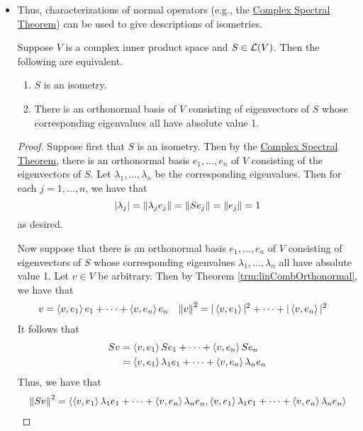 \documentclass[../main.tex]{subfiles}
\begin{document}
\begin{itemize}
    \item Thus, characterizations of normal operators (e.g., the \hyperref[trm:ComplexSpectral]{Complex Spectral Theorem}) can be used to give descriptions of isometries.
    \begin{theorem}\label{trm:isomEigenvalues}
        Suppose $V$ is a complex inner product space and $S\in\mathcal{L}(V)$. Then the following are equivalent.
        \begin{enumerate}[label={\textup{(}\alph*\textup{)}}]
            \item $S$ is an isometry.
            \item There is an orthonormal basis of $V$ consisting of eigenvectors of $S$ whose corresponding eigenvalues all have absolute value 1.
        \end{enumerate}
        \begin{proof}
            Suppose first that $S$ is an isometry. Then by the \hyperref[trm:ComplexSpectral]{Complex Spectral Theorem}, there is an orthonormal basis $e_1,\dots,e_n$ of $V$ consisting of the eigenvectors of $S$. Let $\lambda_1,\dots,\lambda_n$ be the corresponding eigenvalues. Then for each $j=1,\dots,n$, we have that
            \begin{equation*}
                |\lambda_j| = \norm{\lambda_je_j} = \norm{Se_j} = \norm{e_j} = 1
            \end{equation*}
            as desired.\par
            Now suppose that there is an orthonormal basis $e_1,\dots,e_n$ of $V$ consisting of eigenvectors of $S$ whose corresponding eigenvalues $\lambda_1,\dots,\lambda_n$ all have absolute value 1. Let $v\in V$ be arbitrary. Then by Theorem \ref{trm:linCombOrthonormal}, we have that
            \begin{align*}
                v &= \left\langle{v},{e_1}\right\rangle e_1+\cdots+\left\langle{v},{e_n}\right\rangle e_n&
                \norm{v}^2 &= |\left\langle{v},{e_1}\right\rangle|^2+\cdots+|\left\langle{v},{e_n}\right\rangle|^2
            \end{align*}
            It follows that
            \begin{align*}
                Sv &= \left\langle{v},{e_1}\right\rangle Se_1+\cdots+\left\langle{v},{e_n}\right\rangle Se_n\\
                &= \left\langle{v},{e_1}\right\rangle\lambda_1e_1+\cdots+\left\langle{v},{e_n}\right\rangle\lambda_ne_n
            \end{align*}
            Thus, we have that
            \begin{align*}
                \norm{Sv}^2 &= \inp{\inp{v}{e_1}\lambda_1e_1+\cdots+\inp{v}{e_n}\lambda_ne_n}{\inp{v}{e_1}\lambda_1e_1+\cdots+\inp{v}{e_n}\lambda_ne_n}\\

\end{align*}
\end{proof}
\end{theorem}
\end{itemize}
\end{document}
